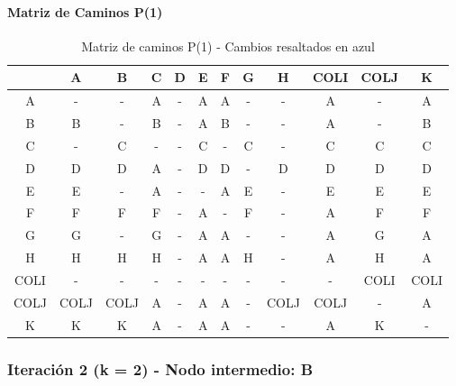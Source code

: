 \documentclass[12pt]{article}
\begin{document}
\paragraph{Matriz de Caminos P(1)}
\begin{table}[h!]
\centering
\begin{tabular}{|c|c|c|c|c|c|c|c|c|c|c|c|}
\hline
 & A & B & C & D & E & F & G & H & COLI & COLJ & K \\\hline
A & - & - & A & - & A & A & - & - & A & - & A \\\hline
B & B & - & B & - & \cellcolor{lightblue} A & B & - & - & \cellcolor{lightblue} A & - & B \\\hline
C & - & C & - & - & C & - & C & - & C & C & C \\\hline
D & D & D & \cellcolor{lightblue} A & - & D & D & - & D & D & D & D \\\hline
E & E & - & \cellcolor{lightblue} A & - & - & \cellcolor{lightblue} A & E & - & E & E & E \\\hline
F & F & F & F & - & \cellcolor{lightblue} A & - & F & - & \cellcolor{lightblue} A & F & F \\\hline
G & G & - & G & - & \cellcolor{lightblue} A & \cellcolor{lightblue} A & - & - & \cellcolor{lightblue} A & G & \cellcolor{lightblue} A \\\hline
H & H & H & H & - & \cellcolor{lightblue} A & \cellcolor{lightblue} A & H & - & \cellcolor{lightblue} A & H & \cellcolor{lightblue} A \\\hline
COLI & - & - & - & - & - & - & - & - & - & COLI & COLI \\\hline
COLJ & COLJ & COLJ & \cellcolor{lightblue} A & - & \cellcolor{lightblue} A & \cellcolor{lightblue} A & - & COLJ & COLJ & - & \cellcolor{lightblue} A \\\hline
K & K & K & \cellcolor{lightblue} A & - & \cellcolor{lightblue} A & \cellcolor{lightblue} A & - & - & \cellcolor{lightblue} A & K & - \\\hline
\end{tabular}
\caption{Matriz de caminos P(1) - Cambios resaltados en azul}
\end{table}

\subsubsection{Iteración 2 (k = 2) - Nodo intermedio: B}
\end{document}
